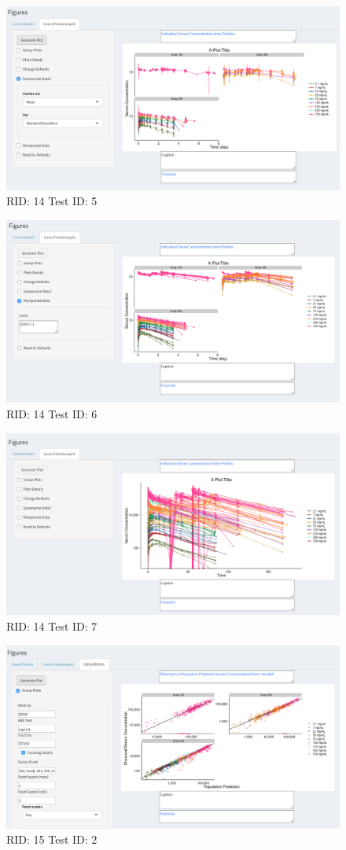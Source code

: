 \begin{figure}[H]
\includegraphics[width=.8\textwidth]{screencaps/14-5-1.png}
\caption{RID: 14 Test ID: 5}
\end{figure}
\begin{figure}[H]
\includegraphics[width=.8\textwidth]{screencaps/14-6-1.png}
\caption{RID: 14 Test ID: 6}
\end{figure}
\begin{figure}[H]
\includegraphics[width=.8\textwidth]{screencaps/14-7-1.png}
\caption{RID: 14 Test ID: 7}
\end{figure}
\begin{figure}[H]
\includegraphics[width=.8\textwidth]{screencaps/15-2-1.png}
\caption{RID: 15 Test ID: 2}
\end{figure}
